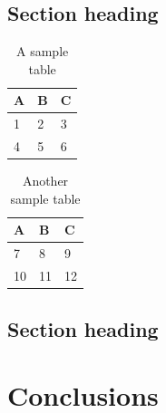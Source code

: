 \documentclass{csuebthesis} %
\begin{document}
\lipsum[1]

\section{Section heading}

\lipsum[2-3]

\begin{table}[h]
\centering
\begin{tabular}{lll}
A & B & C \\
\hline
1 & 2 & 3 \\
4 & 5 & 6
\end{tabular}
\caption{A sample table}
\end{table}

\lipsum[4-5]

\begin{table}[h]
\centering
\begin{tabular}{lll}
A & B & C \\
\hline
7  & 8  & 9 \\
10 & 11 & 12
\end{tabular}
\caption{Another sample table}
\end{table}

\section{Section heading}

\lipsum[6-10]

\chapter{Conclusions}

\lipsum[1-5]

\printbibliography[heading=bibintoc]
\end{document}
